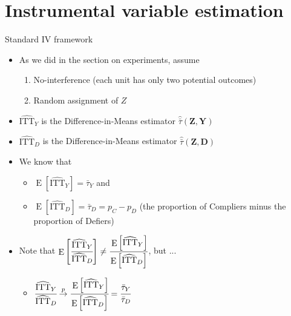 \documentclass[table, xcolor={dvipsnames}, 9pt]{beamer}
\theoremstyle{newstyle}
\DeclareMathOperator{\E}{\mathrm{E}}
\begin{document}
\section{Instrumental variable estimation}
\begin{frame}{Standard IV framework}
\begin{itemize}
\item As we did in the section on experiments, assume
\begin{enumerate}
\item \pause No-interference (each unit has only two potential outcomes)
\item \pause Random assignment of $Z$
\end{enumerate}	
\item \pause $\widehat{\text{ITT}}_Y$ is the Difference-in-Means estimator $\hat{\bar{\tau}}\left(\mathbf{Z}, \mathbf{Y}\right)$ 
\item \pause $\widehat{\text{ITT}}_D$ is the Difference-in-Means estimator $\hat{\bar{\tau}}\left(\mathbf{Z}, \mathbf{D}\right)$ 
\item \pause We know that 
\begin{itemize}
\item \pause $\E\left[\widehat{\text{ITT}}_Y\right] = \bar{\tau}_Y$ and 
\item \pause $\E\left[\widehat{\text{ITT}}_D\right] = \bar{\tau}_D = p_C - p_D$ (the proportion of Compliers minus the proportion of Defiers)
\end{itemize}
\item \pause Note that $\E\left[\cfrac{\widehat{\text{ITT}}_Y}{\widehat{\text{ITT}}_D}\right] \neq \cfrac{\E\left[\widehat{\text{ITT}}_Y\right]}{\E\left[\widehat{\text{ITT}}_D\right]}$, but ...
\begin{itemize}
\item \pause $\cfrac{\widehat{\text{ITT}}_Y}{\widehat{\text{ITT}}_D} \overset{p}{\to} \cfrac{\E\left[\widehat{\text{ITT}}_Y\right]}{\E\left[\widehat{\text{ITT}}_D\right]} = \cfrac{\bar{\tau}_Y}{\bar{\tau}_D}$
\end{itemize}
\end{itemize}
\end{frame}
\end{document}
